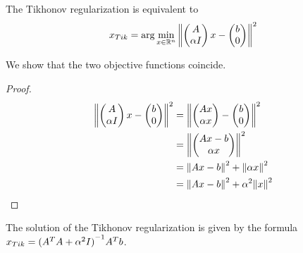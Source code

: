 \documentclass[computational_mathematics.tex]{subfiles}
\begin{document}
\begin{proposition}
The Tikhonov regularization is equivalent to 
\begin{equation} \label{eq:7novxtik}
  x_{Tik} = \arg \min_{x\in\mathbb{R}^n} {\left\lVert\begin{pmatrix}
    A\\
    \alpha I
\end{pmatrix} x - \begin{pmatrix}
    b\\0
\end{pmatrix}\right\rVert}^2
\end{equation}
\end{proposition}
We show that the two objective functions coincide.
\begin{proof}
  \begin{equation}
    \begin{aligned}
      {\left\lVert\begin{pmatrix}
        A\\
        \alpha I
      \end{pmatrix} x -
      \begin{pmatrix}
        b\\0
      \end{pmatrix}\right\rVert}^2 &= {\left\lVert\begin{pmatrix}
        Ax\\
        \alpha x
      \end{pmatrix} -
      \begin{pmatrix}
        b\\0
      \end{pmatrix}\right\rVert}^2\\
      &= {\left\lVert\begin{pmatrix}
        Ax - b\\
        \alpha x
      \end{pmatrix}\right\rVert}^2\\
      &= {\left\lVert Ax-b\right\rVert}^2 + {\left\lVert\alpha x\right\rVert}^2\\
      &= {\left\lVert Ax-b\right\rVert}^2 + \alpha^2 {\left\lVert x\right\rVert}^2\\
    \end{aligned}
  \end{equation}
\end{proof}

\begin{proposition}
The solution of the Tikhonov regularization is given by the formula $x_{Tik}={({A}^{T}A + {\alpha}^{2} I)}^{-1}{A}^{T} b$.
\end{proposition}
\end{document}
